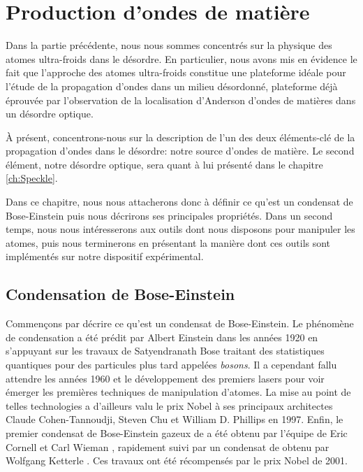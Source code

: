 \chapter{Production d'ondes de matière}
\label{ch:BEC_manip}

Dans la partie précédente, nous nous sommes concentrés sur la physique des atomes ultra-froids dans le désordre. En particulier, nous avons mis en évidence le fait que l'approche des atomes ultra-froids constitue une plateforme idéale pour l'étude de la propagation d'ondes dans un milieu désordonné, plateforme déjà éprouvée par l'observation de la localisation d'Anderson d'ondes de matières dans un désordre optique. 

À présent, concentrons-nous sur la description de l'un des deux éléments-clé de la propagation d'ondes dans le désordre: notre source d'ondes de matière. Le second élément, notre désordre optique, sera quant à lui présenté dans le chapitre \ref{ch:Speckle}.

Dans ce chapitre, nous nous attacherons donc à définir ce qu'est un condensat de Bose-Einstein puis nous décrirons ses principales propriétés. Dans un second temps, nous nous intéresserons aux outils dont nous disposons pour manipuler les atomes, puis nous terminerons en présentant la manière dont ces outils sont implémentés sur notre dispositif expérimental. 

\section{Condensation de Bose-Einstein}
Commençons par décrire ce qu'est un condensat de Bose-Einstein. Le phénomène de condensation a été prédit par Albert Einstein dans les années 1920 en s'appuyant sur les travaux de Satyendranath Bose traitant des statistiques quantiques pour des particules plus tard appelées \emph{bosons}. Il a cependant fallu attendre les années 1960 et le développement des premiers lasers pour voir émerger les premières techniques de manipulation d'atomes. La mise au point de telles technologies a d'ailleurs valu le prix Nobel à ses principaux architectes Claude Cohen-Tannoudji, Steven Chu et William D. Phillips en 1997. Enfin, le premier condensat de Bose-Einstein gazeux de  a été obtenu par l'équipe de Eric Cornell et Carl Wieman \citep{anderson1995observation}, rapidement suivi par un condensat de  obtenu par Wolfgang Ketterle \citep{davis1995bose}. Ces travaux ont été récompensés par le prix Nobel de 2001.

